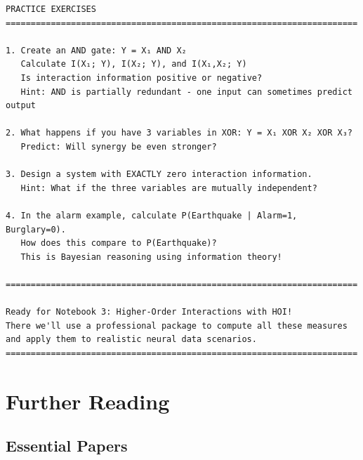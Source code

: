 \documentclass[
  11pt,
  letterpaper,
  oneside,
  openany]{book}
\begin{document}
\begin{verbatim}
PRACTICE EXERCISES
======================================================================

1. Create an AND gate: Y = X₁ AND X₂
   Calculate I(X₁; Y), I(X₂; Y), and I(X₁,X₂; Y)
   Is interaction information positive or negative?
   Hint: AND is partially redundant - one input can sometimes predict output

2. What happens if you have 3 variables in XOR: Y = X₁ XOR X₂ XOR X₃?
   Predict: Will synergy be even stronger?

3. Design a system with EXACTLY zero interaction information.
   Hint: What if the three variables are mutually independent?

4. In the alarm example, calculate P(Earthquake | Alarm=1, Burglary=0).
   How does this compare to P(Earthquake)?
   This is Bayesian reasoning using information theory!

======================================================================

Ready for Notebook 3: Higher-Order Interactions with HOI!
There we'll use a professional package to compute all these measures
and apply them to realistic neural data scenarios.
======================================================================
\end{verbatim}

\section{Further Reading}\label{further-reading}

\subsection{Essential Papers}\label{essential-papers}
\end{document}
